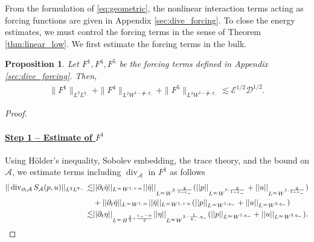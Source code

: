 \documentclass[letterpaper,reqno,10pt,twoside]{amsart}
\newtheorem{proposition}[theorem]{Proposition}
\theoremstyle{definition}
\theoremstyle{remark}
\begin{document}
	From the formulation of \eqref{eq:geometric}, the nonlinear interaction terms acting as forcing functions are given in Appendix \ref{sec:dive_forcing}.
	To close the energy estimates, we must control the forcing terms in the sense of Theorem \ref{thm:linear_low}. We first estimate the forcing terms in the bulk.
	\begin{proposition}\label{prop:force_bulk}
		Let $F^{1}, F^{4}, F^{5}$ be the  forcing terms defined in Appendix \ref{sec:dive_forcing}. Then,
		\[
		\begin{aligned}
			\|F^1\|_{L^2 L^{q_-}}+\|F^{4}\|_{L^2W^{1-\frac{1}{q_{-}},q_{-}}}+\|F^{5}\|_{L^{2}W^{1-\frac{1}{q_{-}},q_{-}}}\lesssim \mathscr{E}^{1/2}\mathscr{D}^{1/2}.
		\end{aligned}
		\]
	\end{proposition}
	\begin{proof}
		\ 
		\paragraph{\underline{Step 1 -- Estimate of $F^{1}$}} 
		
		Using H\"older's inequality, Sobolev embedding, the trace theory, and the bound on $\mathcal{A}$, we estimate terms including  $\operatorname{div}_{\mathcal{A}}$ in $F^{1}$ as follows
		\begin{align}{\label{eq:f_1}}
			\begin{aligned}
				\vert \vert \operatorname{div}_{\partial_{t}\mathcal{A}}S_{\mathcal{A}}(p,u)\vert \vert_{L^{2}L^{q_{-}}}\lesssim& \vert \vert \partial_{t}\bar{\eta}\vert \vert_{L^{\infty}W^{1,+\infty}}\vert \vert \bar{\eta}\vert \vert_{L^{\infty}W^{2,\frac{2}{1-\varepsilon_{-}}}}(\vert \vert p\vert \vert_{L^{\infty}W^{0,\frac{2}{1-\varepsilon_{-}}}}+\vert \vert u\vert \vert_{L^{\infty}W^{1,\frac{2}{1-\varepsilon_{-}}}})\notag\\
				&+\vert \vert \partial_{t}\bar{\eta}\vert \vert_{L^{\infty}W^{1,\infty}}\vert \vert \bar{\eta}\vert \vert_{L^{\infty}W^{1,+\infty}}(\vert \vert p\vert \vert_{L^{\infty}W^{1,q_{-}}}+\vert \vert u\vert \vert_{L^{\infty}W^{2,q_{-}}})\notag\\
				\lesssim& \vert \vert \partial_{t}\eta\vert \vert_{L^{\infty}H^{\frac{3}{2}+\frac{\varepsilon_{-}-\alpha}{2}}}\vert \vert \eta\vert \vert_{L^{\infty}W^{3-\frac{1}{q_{-}},q_{-}}}(\vert \vert p\vert \vert_{L^{\infty}W^{1,q_{-}}}+\vert \vert u\vert \vert_{L^{\infty}W^{2,q_{-}}}).
			\end{aligned}
		\end{align}
		

\end{proof}
\end{document}
